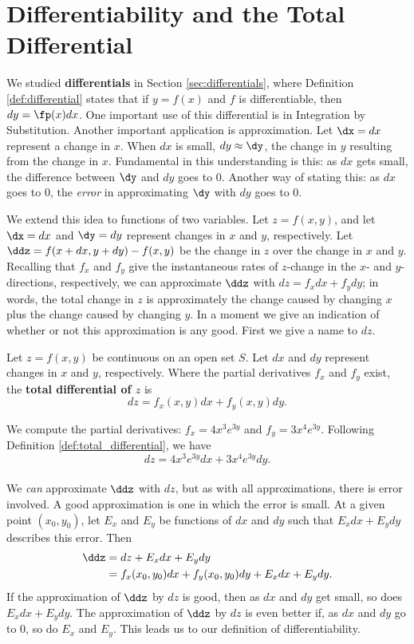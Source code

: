 \section{Differentiability and the Total Differential}\label{sec:total_differential}

We studied  \textbf{differentials} in Section \ref{sec:differentials}, where Definition \ref{def:differential}  states that if $y=f(x)$ and $f$ is differentiable, then $dy=\fp(x)dx$. One important use of this differential is in Integration by Substitution. Another important application is approximation. Let $\dx = dx$ represent a change in $x$. When $dx$ is small, $dy\approx \dy$, the change in $y$ resulting from the change in $x$. Fundamental in this understanding is this: as $dx$ gets small, the difference between $\dy$ and $dy$ goes to 0. Another way of stating this: as $dx$ goes to 0, the \textit{error} in approximating $\dy$ with $dy$ goes to 0.

We extend this idea to functions of two variables. Let $z=f(x,y)$, and let $\dx = dx$ and $\dy=dy$ represent changes in $x$ and $y$, respectively. Let $\ddz = f(x+dx,y+dy) - f(x,y)$ be the change in $z$ over the change in $x$ and $y$. Recalling that $f_x$ and $f_y$ give the instantaneous rates of $z$-change in the $x$- and $y$-directions, respectively, we can approximate $\ddz$ with $dz = f_xdx+f_ydy$; in words, the total change in $z$ is approximately the change caused by changing $x$ plus the change caused by changing $y$. In a moment we give an indication of whether or not this approximation is any good. First we give a name to $dz$.

{Let $z=f(x,y)$ be continuous on an open set $S$. Let $dx$ and $dy$ represent changes in $x$ and $y$, respectively. Where the partial derivatives $f_x$ and $f_y$ exist, the \textbf{total differential of $z$} is 
$$dz = f_x(x,y)dx + f_y(x,y)dy.$$
}

{We compute the partial derivatives: $f_x = 4x^3e^{3y}$ and $f_y = 3x^4e^{3y}$. Following Definition \ref{def:total_differential}, we have
$$dz = 4x^3e^{3y}dx+3x^4e^{3y}dy.$$
\baselineskip
}\\

We \textit{can} approximate $\ddz$ with $dz$, but as with all approximations, there is error involved. A good approximation is one in which the error is small. At a given point $(x_0,y_0)$, let $E_x$ and $E_y$ be functions of $dx$ and $dy$ such that $E_xdx+E_ydy$ describes this error. Then
\begin{align*}
\ddz &= dz + E_xdx+ E_ydy \\
		&= f_x(x_0,y_0)dx+f_y(x_0,y_0)dy + E_xdx+E_ydy.
\end{align*}
If the approximation of $\ddz$ by $dz$ is good, then as $dx$ and $dy$ get small,  so does $E_xdx+E_ydy$. The approximation of $\ddz$ by $dz$ is even better if, as $dx$ and $dy$ go to 0, so do $E_x$ and $E_y$. This leads us to our definition of differentiability.


